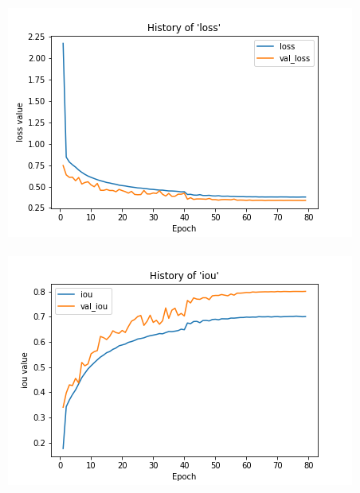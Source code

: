 \begin{figure}
     \centering
     \begin{subfigure}[b]{0.49\textwidth}
         \centering
         \includegraphics[width=\textwidth]{images/float32_hist_of_loss.png}
         \caption{}
         \label{fig:float_loss}
     \end{subfigure}
     \hfill
     \begin{subfigure}[b]{0.49\textwidth}
         \centering
         \includegraphics[width=\textwidth]{images/float32_hist_of_iou.png}
         \caption{}
         \label{fig:float_iou}
     \end{subfigure}
     \hfill
     \begin{subfigure}[b]{0.49\textwidth}
         \centering

\end{subfigure}
\end{figure}

